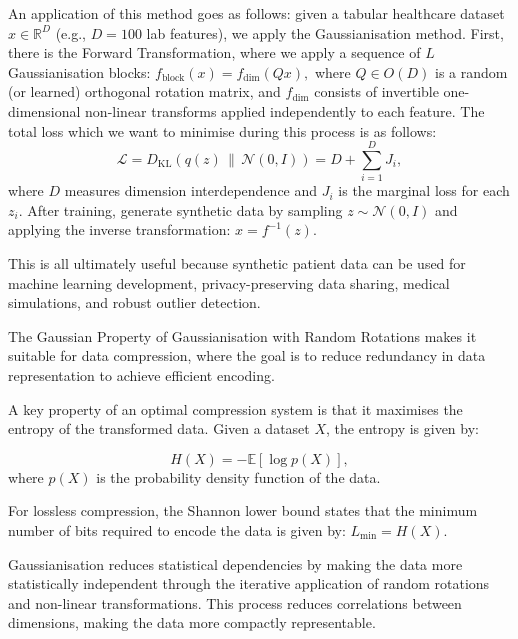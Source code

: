 An application of this method goes as follows: given a tabular healthcare dataset \( x \in \mathbb{R}^D \) (e.g., \( D = 100 \) lab features), we apply the Gaussianisation method. First, there is the 
Forward Transformation, where we apply a sequence of \( L \) Gaussianisation blocks:
$f_{\mathrm{block}}(x) = f_{\mathrm{dim}}(Qx),$ where \( Q \in O(D) \) is a random (or learned) orthogonal rotation matrix, and \( f_{\mathrm{dim}} \) consists of invertible one-dimensional non-linear transforms applied independently to each feature. The total loss which we want to minimise during this process is as follows:
\[
    \mathcal{L} = D_{\mathrm{KL}}(q(z) \, \| \, \mathcal{N}(0, I)) = D + \sum_{i=1}^D J_i,\]
    where \( D \) measures dimension interdependence and \( J_i \) is the marginal loss for each \( z_i \). After training, generate synthetic data by sampling \( z \sim \mathcal{N}(0, I) \) and applying the inverse transformation:
    \(
    x = f^{-1}(z).
    \)
    
This is all ultimately useful because synthetic patient data can be used for machine learning development, privacy-preserving data sharing, medical simulations, and robust outlier detection.


The Gaussian Property of Gaussianisation with Random Rotations makes it suitable for data compression, where the goal is to reduce redundancy in data representation to achieve efficient encoding.\cite{theiler2021distilled} 

A key property of an optimal compression system is that it maximises the entropy of the transformed data.\cite{theiler2021distilled} Given a dataset $X$, the entropy is given by:

\begin{equation}
H(X) = - \mathbb{E} [\log p(X)],
\end{equation}
where $p(X)$ is the probability density function of the data.

\noindent For lossless compression, the Shannon lower bound states that the minimum number of bits required to encode the data is given by:
$L_{\text{min}} = H(X)$.\cite{eecs_data_compression}


Gaussianisation reduces statistical dependencies by making the data more statistically independent through the iterative application of random rotations and non-linear transformations.\cite{johnson2020gaussianization} This process reduces correlations between dimensions, making the data more compactly representable.\cite{johnson2020gaussianization} 

